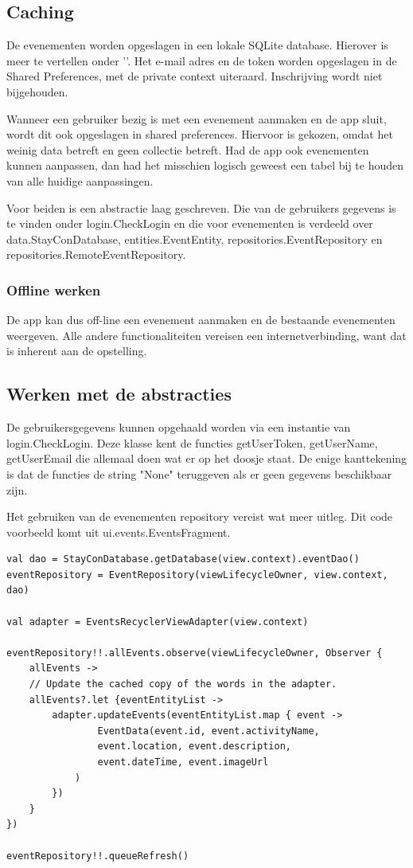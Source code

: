 \documentclass[dutch]{report}
\begin{document}
	\subsection{Caching}
	De evenementen worden opgeslagen in een lokale SQLite database. Hierover is meer te vertellen onder 
	''. Het e-mail adres en de token worden opgeslagen in de Shared Preferences, 
	met de private context uiteraard. Inschrijving wordt niet bijgehouden. 
	
	Wanneer een gebruiker bezig is met een evenement aanmaken en de app sluit, wordt dit ook opgeslagen 
	in shared preferences. Hiervoor is gekozen, omdat het weinig data betreft en geen collectie betreft. 
	Had de app ook evenementen kunnen aanpassen, dan had het misschien logisch geweest een tabel bij te 
	houden van alle huidige aanpassingen.  
	
	Voor beiden is een abstractie laag geschreven. Die van de gebruikers gegevens is te vinden onder 
	login.CheckLogin en die voor evenementen is verdeeld over data.StayConDatabase, entities.EventEntity,
	repositories.EventRepository en repositories.RemoteEventRepository. 
	
	\subsubsection{Offline werken}
	De app kan dus off-line een evenement aanmaken en de bestaande evenementen weergeven. Alle andere
	functionaliteiten vereisen een internetverbinding, want dat is inherent aan de opstelling. 
	
	\subsection{Werken met de abstracties}
	De gebruikersgegevens kunnen opgehaald worden via een instantie van login.CheckLogin. Deze klasse
	kent de functies getUserToken, getUserName, getUserEmail die allemaal doen wat er op het doosje staat. 
	De enige kanttekening is dat de functies de string "None" teruggeven als er geen gegevens beschikbaar
	zijn. 
	
	Het gebruiken van de evenementen repository vereist wat meer uitleg. Dit code voorbeeld komt uit 
	ui.events.EventsFragment. 
	
	\begin{lstlisting}
val dao = StayConDatabase.getDatabase(view.context).eventDao()
eventRepository = EventRepository(viewLifecycleOwner, view.context, dao)

val adapter = EventsRecyclerViewAdapter(view.context)

eventRepository!!.allEvents.observe(viewLifecycleOwner, Observer { 
	allEvents ->
	// Update the cached copy of the words in the adapter.
	allEvents?.let {eventEntityList ->
		adapter.updateEvents(eventEntityList.map { event ->
				EventData(event.id, event.activityName, 
				event.location, event.description, 
				event.dateTime, event.imageUrl
			)
		})
	}
})

eventRepository!!.queueRefresh()

	\end{lstlisting}
	
\end{document}

